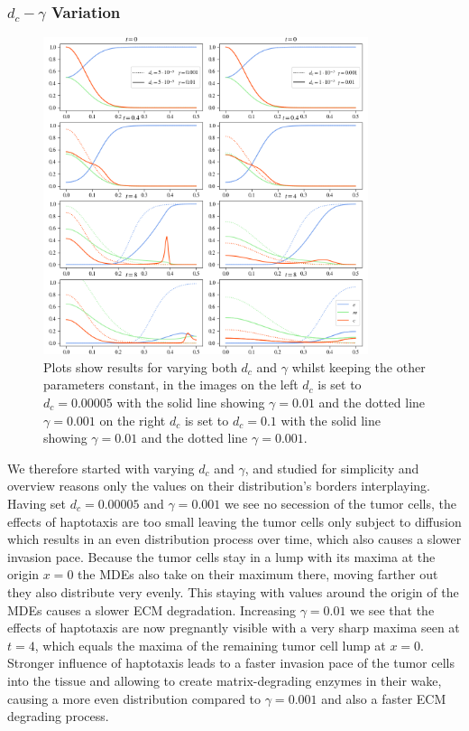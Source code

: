 \subsubsection*{$d_c - \gamma$ Variation}
\begin{figure}[h]
    \centering
    \includegraphics[width=0.85\textwidth]{resources/images/dc_gamma_variation.png}
    \caption{Plots show results for varying both $d_c$ and $\gamma$ whilst keeping the other parameters constant, in the images on the left $d_c$ is set to $d_c=0.00005$ with the solid line showing $\gamma = 0.01$ and the dotted line $\gamma=0.001$ on the right $d_c$ is set to $d_c=0.1$ with the solid line showing $\gamma = 0.01$ and the dotted line $\gamma=0.001$.}
    \label{fig:dc_gamma_variation}
\end{figure}
We therefore started with varying $d_c$ and $\gamma$, and studied for simplicity and overview reasons only the values on their distribution's borders interplaying.\newline
Having set $d_c=0.00005$ and $\gamma=0.001$ we see no secession of the tumor cells, the effects of haptotaxis are too small leaving the tumor cells only subject to diffusion which results in an even distribution process over time, which also causes a slower invasion pace. Because the tumor cells stay in a lump with its maxima at the origin $x=0$ the MDEs also take on their maximum there, moving farther out they also distribute very evenly. This staying with values around the origin of the MDEs causes a slower ECM degradation. Increasing $\gamma=0.01$ we see that the effects of haptotaxis are now pregnantly visible with a very sharp maxima seen at $t=4$, which equals the maxima of the remaining tumor cell lump at $x=0$. Stronger influence of haptotaxis leads to a faster invasion pace of the tumor cells into the tissue and allowing to create matrix-degrading enzymes in their wake, causing a more even distribution compared to $\gamma=0.001$ and also a faster ECM degrading process. 
